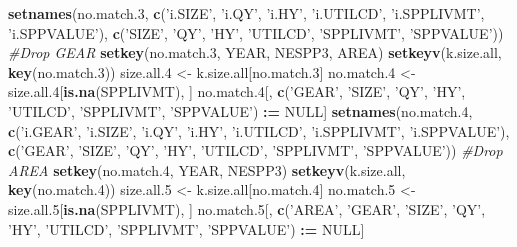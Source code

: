 \documentclass[]{article}
\newenvironment{Shaded}{\begin{snugshade}}{\end{snugshade}}
\newcommand{\KeywordTok}[1]{\textcolor[rgb]{0.13,0.29,0.53}{\textbf{#1}}}
\newcommand{\DecValTok}[1]{\textcolor[rgb]{0.00,0.00,0.81}{#1}}
\newcommand{\StringTok}[1]{\textcolor[rgb]{0.31,0.60,0.02}{#1}}
\newcommand{\CommentTok}[1]{\textcolor[rgb]{0.56,0.35,0.01}{\textit{#1}}}
\newcommand{\OtherTok}[1]{\textcolor[rgb]{0.56,0.35,0.01}{#1}}
\newcommand{\OperatorTok}[1]{\textcolor[rgb]{0.81,0.36,0.00}{\textbf{#1}}}
\newcommand{\ErrorTok}[1]{\textcolor[rgb]{0.64,0.00,0.00}{\textbf{#1}}}
\newcommand{\NormalTok}[1]{#1}
\begin{document}
\begin{Shaded}
\begin{Highlighting}[]
  \KeywordTok{setnames}\NormalTok{(no.match.}\DecValTok{3}\NormalTok{, }\KeywordTok{c}\NormalTok{(}\StringTok{'i.SIZE'}\NormalTok{, }\StringTok{'i.QY'}\NormalTok{, }\StringTok{'i.HY'}\NormalTok{, }\StringTok{'i.UTILCD'}\NormalTok{, }\StringTok{'i.SPPLIVMT'}\NormalTok{, }\StringTok{'i.SPPVALUE'}\NormalTok{), }
           \KeywordTok{c}\NormalTok{(}\StringTok{'SIZE'}\NormalTok{, }\StringTok{'QY'}\NormalTok{, }\StringTok{'HY'}\NormalTok{, }\StringTok{'UTILCD'}\NormalTok{, }\StringTok{'SPPLIVMT'}\NormalTok{, }\StringTok{'SPPVALUE'}\NormalTok{))}
  \CommentTok{#Drop GEAR}
  \KeywordTok{setkey}\NormalTok{(no.match.}\DecValTok{3}\NormalTok{, YEAR, NESPP3, AREA)}
  \KeywordTok{setkeyv}\NormalTok{(k.size.all, }\KeywordTok{key}\NormalTok{(no.match.}\DecValTok{3}\NormalTok{))}
\NormalTok{  size.all.}\DecValTok{4}\NormalTok{ <-}\StringTok{ }\NormalTok{k.size.all[no.match.}\DecValTok{3}\NormalTok{]}
\NormalTok{  no.match.}\DecValTok{4}\NormalTok{ <-}\StringTok{ }\NormalTok{size.all.}\DecValTok{4}\NormalTok{[}\KeywordTok{is.na}\NormalTok{(SPPLIVMT), ]}
\NormalTok{  no.match.}\DecValTok{4}\NormalTok{[, }\KeywordTok{c}\NormalTok{(}\StringTok{'GEAR'}\NormalTok{, }\StringTok{'SIZE'}\NormalTok{, }\StringTok{'QY'}\NormalTok{, }\StringTok{'HY'}\NormalTok{, }\StringTok{'UTILCD'}\NormalTok{, }\StringTok{'SPPLIVMT'}\NormalTok{, }\StringTok{'SPPVALUE'}\NormalTok{) }\OperatorTok{:}\ErrorTok{=}\StringTok{ }\OtherTok{NULL}\NormalTok{]}
  \KeywordTok{setnames}\NormalTok{(no.match.}\DecValTok{4}\NormalTok{, }\KeywordTok{c}\NormalTok{(}\StringTok{'i.GEAR'}\NormalTok{, }\StringTok{'i.SIZE'}\NormalTok{, }\StringTok{'i.QY'}\NormalTok{, }\StringTok{'i.HY'}\NormalTok{, }\StringTok{'i.UTILCD'}\NormalTok{, }\StringTok{'i.SPPLIVMT'}\NormalTok{, }\StringTok{'i.SPPVALUE'}\NormalTok{), }
                       \KeywordTok{c}\NormalTok{(}\StringTok{'GEAR'}\NormalTok{,   }\StringTok{'SIZE'}\NormalTok{,   }\StringTok{'QY'}\NormalTok{,   }\StringTok{'HY'}\NormalTok{,  }\StringTok{'UTILCD'}\NormalTok{,  }\StringTok{'SPPLIVMT'}\NormalTok{, }\StringTok{'SPPVALUE'}\NormalTok{))}
  \CommentTok{#Drop AREA}
  \KeywordTok{setkey}\NormalTok{(no.match.}\DecValTok{4}\NormalTok{, YEAR, NESPP3)}
  \KeywordTok{setkeyv}\NormalTok{(k.size.all, }\KeywordTok{key}\NormalTok{(no.match.}\DecValTok{4}\NormalTok{))}
\NormalTok{  size.all.}\DecValTok{5}\NormalTok{ <-}\StringTok{ }\NormalTok{k.size.all[no.match.}\DecValTok{4}\NormalTok{]}
\NormalTok{  no.match.}\DecValTok{5}\NormalTok{ <-}\StringTok{ }\NormalTok{size.all.}\DecValTok{5}\NormalTok{[}\KeywordTok{is.na}\NormalTok{(SPPLIVMT), ]}
\NormalTok{  no.match.}\DecValTok{5}\NormalTok{[, }\KeywordTok{c}\NormalTok{(}\StringTok{'AREA'}\NormalTok{, }\StringTok{'GEAR'}\NormalTok{, }\StringTok{'SIZE'}\NormalTok{, }\StringTok{'QY'}\NormalTok{, }\StringTok{'HY'}\NormalTok{, }\StringTok{'UTILCD'}\NormalTok{, }\StringTok{'SPPLIVMT'}\NormalTok{, }\StringTok{'SPPVALUE'}\NormalTok{) }\OperatorTok{:}\ErrorTok{=}\StringTok{ }\OtherTok{NULL}\NormalTok{]}

\end{Highlighting}
\end{Shaded}
\end{document}
